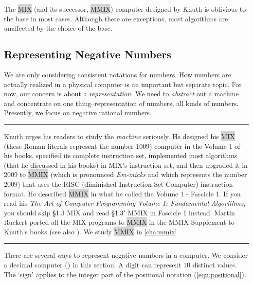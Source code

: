 The \colorbox{lightgray}{MIX} (and its successor, \colorbox{lightgray}{MMIX}) computer designed by Knuth is oblivious to the base in most cases. Although there are exceptions, most algorithms are unaffected by the choice of the base. 

\subsection*{Representing Negative Numbers}
We are only considering consistent notations for numbers. How numbers are actually realized in a physical computer is an important but separate topic. For now, our concern is about a \textit{representation}. We need to \textit{abstract} out a machine and concentrate on one thing--representation of numbers, all kinds of numbers. Presently, we focus on negative rational numbers. 

\vspace{5pt}
\hrule
\vspace{5pt}

Knuth urges his readers to study the \textit{machine} seriously. He designed his \colorbox{lightgray}{MIX} (these Roman literals represent the number $1009$) computer in the Volume 1 of his books, specified its complete instruction set, implemented most algorithms (that he discussed in his books) in MIX's instruction set, and then upgraded it in 2009 to \colorbox{lightgray}{MMIX} (which is pronounced \textit{Em-micks} and which represents the number $2009$) that uses the RISC (diminished Instruction Set Computer) instruction format. He described \colorbox{lightgray}{MMIX} in what he called the Volume 1 - Fascicle 1. If you read his \textit{The Art of Computer Programming Volume 1: Fundamental Algorithms}, you should skip \S 1.3 MIX and read \S 1.3$'$ MMIX in Fascicle 1 instead. Martin Ruckert ported all the MIX programs to \colorbox{lightgray}{MMIX} in the MMIX Supplement to Knuth's books (see also \cite{mmix}). We study \colorbox{lightgray}{MMIX} in \ref{cha:mmix}. 

\vspace{5pt}
\hrule
\vspace{5pt}

\noindent There are several ways to represent negative numbers in a computer. We consider a decimal computer (\cite{DecComp}) in this section. A digit can represent $10$ distinct values. The `sign' applies to the integer part of the positional notation (\ref{eqn:positional}).

